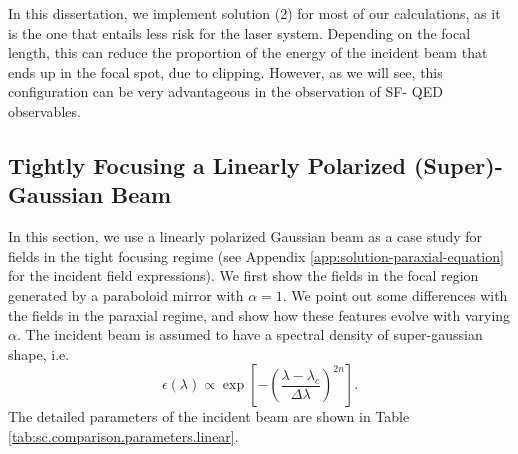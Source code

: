 \documentclass[11pt,SymmetricalJury]{inrsthesis/inrsthesis}
\begin{document}
In this dissertation, we implement solution (2) for most of our calculations, as
it is the one that entails less risk for the laser system. Depending on the
focal length, this can reduce the proportion of the energy of the incident beam
that ends up in the focal spot, due to clipping. However, as we will see, this
configuration can be very advantageous in the observation of SF- QED
observables.

\subsection{Tightly Focusing a Linearly Polarized (Super)-Gaussian Beam}

In this section, we use a linearly polarized Gaussian beam as a case study for
fields in the tight focusing regime (see Appendix
\ref{app:solution-paraxial-equation} for the incident field expressions). We
first show the fields in the
focal region generated by a paraboloid mirror with $\alpha=1$. We point out some
differences with the fields in the paraxial regime, and show how these features
evolve with varying $\alpha$. The incident beam is assumed to have a spectral
density of super-gaussian shape, i.e.
  \begin{equation}
    \epsilon(\lambda) \propto \exp\left[-\left(\frac{\lambda-\lambda_c}{\Delta\lambda}\right)^{2n}\right].
    \label{eq:sc.sg-spectrum}
  \end{equation}
The detailed parameters of the incident beam are shown in Table
\ref{tab:sc.comparison.parameters.linear}.
\end{document}
